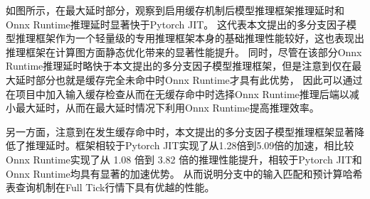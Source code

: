 如图所示，在最大延时部分，观察到启用缓存机制后模型推理框架推理延时和Onnx Runtime推理延时显著快于Pytorch JIT。
这代表本文提出的多分支因子模型推理框架作为一个轻量级的专用推理框架本身的基础推理性能较好，这也表现出推理框架在计算图方面静态优化带来的显著性能提升。
同时，尽管在该部分Onnx Runtime推理延时略快于本文提出的多分支因子模型推理框架，但是注意到仅在最大延时部分也就是缓存完全未命中时Onnx Runtime才具有此优势，
因此可以通过在项目中加入输入缓存检查从而在无缓存命中时选择Onnx Runtime推理后端以减小最大延时，从而在最大延时情况下利用Onnx Runtime提高推理效率。

另一方面，注意到在发生缓存命中时，本文提出的多分支因子模型推理框架显著降低了推理延时。框架相较于Pytorch JIT实现了从1.28倍到5.09倍的加速，相比较Onnx Runtime实现了从 1.08 倍到 3.82 倍的推理性能提升，相较于Pytorch JIT和Onnx Runtime均具有显著的加速优势。
从而说明分支中的输入匹配和预计算哈希表查询机制在Full Tick行情下具有优越的性能。
